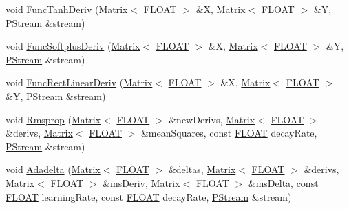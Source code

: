 \begin{DoxyCompactItemize}
\item 
void \hyperlink{classfractal_1_1Engine_a2274e6852df59b22f222c32fe8849591}{Func\+Tanh\+Deriv} (\hyperlink{classfractal_1_1Matrix}{Matrix}$<$ \hyperlink{namespacefractal_a1c2d2530689575d5ccb56bae52af70d3}{F\+L\+O\+A\+T} $>$ \&X, \hyperlink{classfractal_1_1Matrix}{Matrix}$<$ \hyperlink{namespacefractal_a1c2d2530689575d5ccb56bae52af70d3}{F\+L\+O\+A\+T} $>$ \&Y, \hyperlink{classfractal_1_1PStream}{P\+Stream} \&stream)
\item 
void \hyperlink{classfractal_1_1Engine_a326b78899fdc906948a157167af5bb2c}{Func\+Softplus\+Deriv} (\hyperlink{classfractal_1_1Matrix}{Matrix}$<$ \hyperlink{namespacefractal_a1c2d2530689575d5ccb56bae52af70d3}{F\+L\+O\+A\+T} $>$ \&X, \hyperlink{classfractal_1_1Matrix}{Matrix}$<$ \hyperlink{namespacefractal_a1c2d2530689575d5ccb56bae52af70d3}{F\+L\+O\+A\+T} $>$ \&Y, \hyperlink{classfractal_1_1PStream}{P\+Stream} \&stream)
\item 
void \hyperlink{classfractal_1_1Engine_ac9a626dc3b4801eb971dfe3b8d83bdeb}{Func\+Rect\+Linear\+Deriv} (\hyperlink{classfractal_1_1Matrix}{Matrix}$<$ \hyperlink{namespacefractal_a1c2d2530689575d5ccb56bae52af70d3}{F\+L\+O\+A\+T} $>$ \&X, \hyperlink{classfractal_1_1Matrix}{Matrix}$<$ \hyperlink{namespacefractal_a1c2d2530689575d5ccb56bae52af70d3}{F\+L\+O\+A\+T} $>$ \&Y, \hyperlink{classfractal_1_1PStream}{P\+Stream} \&stream)
\item 
void \hyperlink{classfractal_1_1Engine_a0099bf1f318cebb68c7d11640fb40a8e}{Rmsprop} (\hyperlink{classfractal_1_1Matrix}{Matrix}$<$ \hyperlink{namespacefractal_a1c2d2530689575d5ccb56bae52af70d3}{F\+L\+O\+A\+T} $>$ \&new\+Derivs, \hyperlink{classfractal_1_1Matrix}{Matrix}$<$ \hyperlink{namespacefractal_a1c2d2530689575d5ccb56bae52af70d3}{F\+L\+O\+A\+T} $>$ \&derivs, \hyperlink{classfractal_1_1Matrix}{Matrix}$<$ \hyperlink{namespacefractal_a1c2d2530689575d5ccb56bae52af70d3}{F\+L\+O\+A\+T} $>$ \&mean\+Squares, const \hyperlink{namespacefractal_a1c2d2530689575d5ccb56bae52af70d3}{F\+L\+O\+A\+T} decay\+Rate, \hyperlink{classfractal_1_1PStream}{P\+Stream} \&stream)
\item 
void \hyperlink{classfractal_1_1Engine_a3c46d42fbefc7465d122c6ef8ab08497}{Adadelta} (\hyperlink{classfractal_1_1Matrix}{Matrix}$<$ \hyperlink{namespacefractal_a1c2d2530689575d5ccb56bae52af70d3}{F\+L\+O\+A\+T} $>$ \&deltas, \hyperlink{classfractal_1_1Matrix}{Matrix}$<$ \hyperlink{namespacefractal_a1c2d2530689575d5ccb56bae52af70d3}{F\+L\+O\+A\+T} $>$ \&derivs, \hyperlink{classfractal_1_1Matrix}{Matrix}$<$ \hyperlink{namespacefractal_a1c2d2530689575d5ccb56bae52af70d3}{F\+L\+O\+A\+T} $>$ \&ms\+Deriv, \hyperlink{classfractal_1_1Matrix}{Matrix}$<$ \hyperlink{namespacefractal_a1c2d2530689575d5ccb56bae52af70d3}{F\+L\+O\+A\+T} $>$ \&ms\+Delta, const \hyperlink{namespacefractal_a1c2d2530689575d5ccb56bae52af70d3}{F\+L\+O\+A\+T} learning\+Rate, const \hyperlink{namespacefractal_a1c2d2530689575d5ccb56bae52af70d3}{F\+L\+O\+A\+T} decay\+Rate, \hyperlink{classfractal_1_1PStream}{P\+Stream} \&stream)

\end{DoxyCompactItemize}
